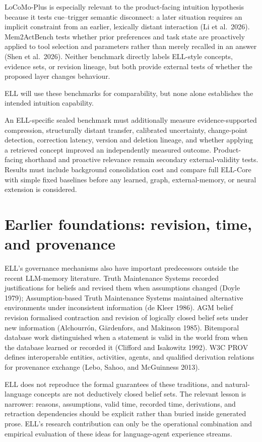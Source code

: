 \documentclass[
  english,
  a4paper,
  DIV=11,
  numbers=noendperiod]{scrreprt}
\newcounter{none} %
\begin{document}
LoCoMo-Plus is especially relevant to the product-facing intuition
hypothesis because it tests cue--trigger semantic disconnect: a later
situation requires an implicit constraint from an earlier, lexically
distant interaction (Li et al.~2026). Mem2ActBench tests whether prior
preferences and task state are proactively applied to tool selection and
parameters rather than merely recalled in an answer (Shen et al.~2026).
Neither benchmark directly labels ELL-style concepts, evidence sets, or
revision lineage, but both provide external tests of whether the
proposed layer changes behaviour.

ELL will use these benchmarks for comparability, but none alone
establishes the intended intuition capability.

An ELL-specific sealed benchmark must additionally measure
evidence-supported compression, structurally distant transfer,
calibrated uncertainty, change-point detection, correction latency,
version and deletion lineage, and whether applying a retrieved concept
improved an independently measured outcome. Product-facing shorthand and
proactive relevance remain secondary external-validity tests. Results
must include background consolidation cost and compare full ELL-Core
with simple fixed baselines before any learned, graph, external-memory,
or neural extension is considered.

\section{Earlier foundations: revision, time, and
provenance}\label{earlier-foundations-revision-time-and-provenance}

ELL's governance mechanisms also have important predecessors outside the
recent LLM-memory literature. Truth Maintenance Systems recorded
justifications for beliefs and revised them when assumptions changed
(Doyle 1979); Assumption-based Truth Maintenance Systems maintained
alternative environments under inconsistent information (de Kleer 1986).
AGM belief revision formalised contraction and revision of logically
closed belief sets under new information (Alchourrón, Gärdenfors, and
Makinson 1985). Bitemporal database work distinguished when a statement
is valid in the world from when the database learned or recorded it
(Clifford and Isakowitz 1992). W3C PROV defines interoperable entities,
activities, agents, and qualified derivation relations for provenance
exchange (Lebo, Sahoo, and McGuinness 2013).

ELL does not reproduce the formal guarantees of these traditions, and
natural-language concepts are not deductively closed belief sets. The
relevant lesson is narrower: reasons, assumptions, valid time, recorded
time, derivations, and retraction dependencies should be explicit rather
than buried inside generated prose. ELL's research contribution can only
be the operational combination and empirical evaluation of these ideas
for language-agent experience streams.
\end{document}
